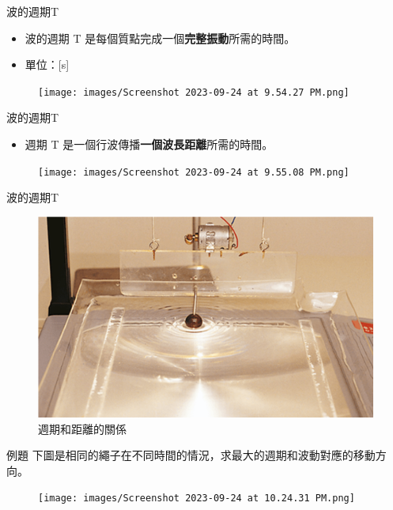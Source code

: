 \documentclass[13pt]{beamer}
\begin{document}
\begin{frame}{波的週期T}
    \begin{itemize}
        \item 波的週期 T 是每個質點完成一個\textbf{完整振動}所需的時間。
        \item 單位：[s]
    \end{itemize}\bigskip
    \begin{figure}
        \centering
        \texttt{[image: images/Screenshot 2023-09-24 at 9.54.27 PM.png]}


    \end{figure}
\end{frame}

\begin{frame}{波的週期T}
    \begin{itemize}
        \item 週期 T 是一個行波傳播\textbf{一個波長距離}所需的時間。
    \end{itemize}\bigskip
    \begin{figure}
        \centering
        \texttt{[image: images/Screenshot 2023-09-24 at 9.55.08 PM.png]}


    \end{figure}
\end{frame}

\begin{frame}{波的週期T}
    \begin{figure}
        \centering
        \includegraphics[width=0.4\linewidth]{images/Picture 1.png}
        \caption{週期和距離的關係}

    \end{figure}
\end{frame}

\begin{frame}[t]{例題}
    下圖是相同的繩子在不同時間的情況，求最大的週期和波動對應的移動方向。
    \begin{figure}
        \centering
        \texttt{[image: images/Screenshot 2023-09-24 at 10.24.31 PM.png]}


    \end{figure}
\end{frame}
\end{document}
